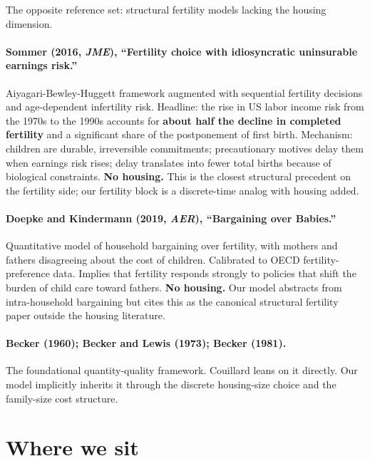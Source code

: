 \documentclass[11pt]{article}
\begin{document}
The opposite reference set: structural fertility models lacking the housing dimension.

\paragraph{Sommer (2016, \emph{JME}), ``Fertility choice with idiosyncratic uninsurable earnings risk.''}
Aiyagari-Bewley-Huggett framework augmented with sequential fertility decisions and age-dependent infertility risk. Headline: the rise in US labor income risk from the 1970s to the 1990s accounts for \textbf{about half the decline in completed fertility} and a significant share of the postponement of first birth. Mechanism: children are durable, irreversible commitments; precautionary motives delay them when earnings risk rises; delay translates into fewer total births because of biological constraints. \textbf{No housing.} This is the closest structural precedent on the fertility side; our fertility block is a discrete-time analog with housing added.

\paragraph{Doepke and Kindermann (2019, \emph{AER}), ``Bargaining over Babies.''}
Quantitative model of household bargaining over fertility, with mothers and fathers disagreeing about the cost of children. Calibrated to OECD fertility-preference data. Implies that fertility responds strongly to policies that shift the burden of child care toward fathers. \textbf{No housing.} Our model abstracts from intra-household bargaining but cites this as the canonical structural fertility paper outside the housing literature.

\paragraph{Becker (1960); Becker and Lewis (1973); Becker (1981).}
The foundational quantity-quality framework. Couillard leans on it directly. Our model implicitly inherits it through the discrete housing-size choice and the family-size cost structure.

\section{Where we sit}
\end{document}
